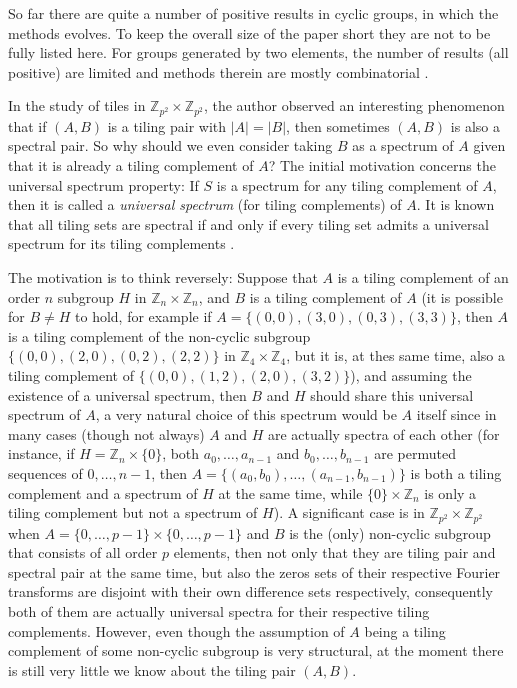 \documentclass[A4, 11pt]{article}
\newcommand{\G}[1]{\mathbb Z_{#1}\times\mathbb Z_{#1}}
\begin{document}
So far there are quite a number of positive results in cyclic groups, in which the methods evolves. To keep the overall size of the paper short they are not to be fully listed here. For groups generated by two elements, the number of results (all positive) are limited and methods therein are mostly combinatorial \cite{fallon2022, Iosevich2017, shi2020, zhang2021}.

In the study of tiles in $\G{p^2}$,  the author observed an interesting phenomenon that if $(A,B)$ is a tiling pair with $|A|=|B|$, then sometimes $(A,B)$ is also a spectral pair. So why should we even consider taking $B$ as a spectrum of $A$ given that it is already a tiling complement of $A$? The initial motivation concerns the universal spectrum property: If $S$ is a spectrum for any tiling complement of $A$, then it is called a \emph{universal spectrum} (for tiling complements) of $A$. It is known that all tiling sets are spectral if and only if every tiling set admits a universal spectrum for its tiling complements \cite{farkas2006, kolounzakis2006, wang1997}. 

The motivation is to think reversely: Suppose that $A$ is a tiling complement of an order $n$ subgroup $H$ in $\G{n}$, and $B$ is a tiling complement of $A$ (it is possible for $B\neq H$ to hold, for example if $A=\{(0,0),(3,0),(0,3),(3,3)\}$, then $A$ is a tiling complement of the non-cyclic subgroup $\{(0,0),(2,0),(0,2),(2,2)\}$ in $\G{4}$, but it is, at thes same time, also a tiling complement of $\{(0,0), (1,2), (2,0), (3,2)\}$), and assuming the existence of a universal spectrum, then $B$ and $H$ should share this universal spectrum of $A$, a very natural choice of this spectrum would be $A$ itself since in many cases (though not always) $A$ and $H$ are actually spectra of each other (for instance, if $H=\mathbb Z_n\times\{0\}$, both $a_0,\ldots,a_{n-1}$ and $b_0,\ldots,b_{n-1}$ are permuted sequences of $0,\ldots,n-1$, then $A=\{(a_0,b_0),\ldots,(a_{n-1},b_{n-1})\}$ is both a tiling complement and a spectrum of $H$ at the same time, while $\{0\}\times\mathbb Z_n$ is only a tiling complement but not a spectrum of $H$). A significant case is in $\G{p^2}$ when $A=\{0,\ldots,p-1\}\times\{0,\ldots,p-1\}$ and $B$ is the (only) non-cyclic subgroup that consists of all order $p$ elements, then not only that they are tiling pair and spectral pair at the same time, but also the zeros sets of their respective Fourier transforms are disjoint with their own difference sets respectively, consequently both of them are actually universal spectra for their respective tiling complements. However, even though the assumption of  $A$ being a tiling complement of some non-cyclic subgroup is very structural, at the moment there is still very little we know about the tiling pair $(A,B)$. 
\end{document}
